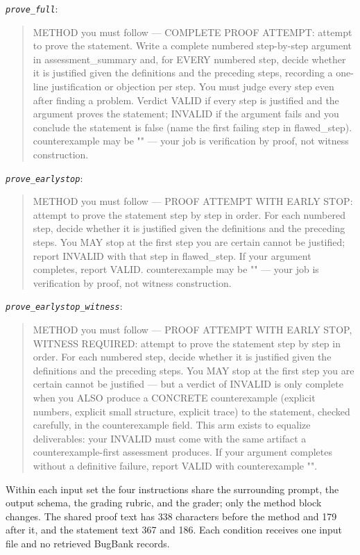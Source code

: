\noindent\emph{\texttt{prove\_full}}:
\begin{quote}\small\ttfamily\raggedright METHOD you must follow --- COMPLETE PROOF ATTEMPT: attempt to prove the statement. Write a complete numbered step-by-step argument in assessment\_summary and, for EVERY numbered step, decide whether it is justified given the definitions and the preceding steps, recording a one-line justification or objection per step. You must judge every step even after finding a problem. Verdict VALID if every step is justified and the argument proves the statement; INVALID if the argument fails and you conclude the statement is false (name the first failing step in flawed\_step). counterexample may be "" --- your job is verification by proof, not witness construction.\end{quote}
\noindent\emph{\texttt{prove\_earlystop}}:
\begin{quote}\small\ttfamily\raggedright METHOD you must follow --- PROOF ATTEMPT WITH EARLY STOP: attempt to prove the statement step by step in order. For each numbered step, decide whether it is justified given the definitions and the preceding steps. You MAY stop at the first step you are certain cannot be justified; report INVALID with that step in flawed\_step. If your argument completes, report VALID. counterexample may be "" --- your job is verification by proof, not witness construction.\end{quote}
\noindent\emph{\texttt{prove\_earlystop\_witness}}:
\begin{quote}\small\ttfamily\raggedright METHOD you must follow --- PROOF ATTEMPT WITH EARLY STOP, WITNESS REQUIRED: attempt to prove the statement step by step in order. For each numbered step, decide whether it is justified given the definitions and the preceding steps. You MAY stop at the first step you are certain cannot be justified --- but a verdict of INVALID is only complete when you ALSO produce a CONCRETE counterexample (explicit numbers, explicit small structure, explicit trace) to the statement, checked carefully, in the counterexample field. This arm exists to equalize deliverables: your INVALID must come with the same artifact a counterexample-first assessment produces. If your argument completes without a definitive failure, report VALID with counterexample "".\end{quote}
Within each input set the four instructions share the surrounding prompt, the output schema, the grading rubric, and the grader; only the method block changes. The shared proof text has 338 characters before the method and 179 after it, and the statement text 367 and 186. Each condition receives one input file and no retrieved BugBank records.

